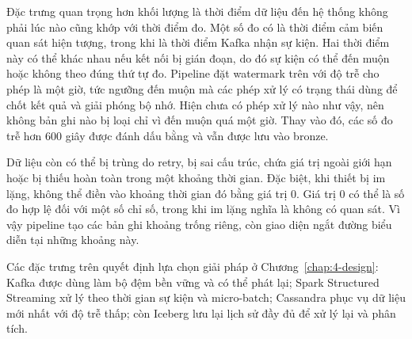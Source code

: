Đặc trưng quan trọng hơn khối lượng là thời điểm dữ liệu đến hệ thống không phải lúc nào cũng khớp với thời điểm đo. Một số đo có  là thời điểm cảm biến quan sát hiện tượng, trong khi  là thời điểm Kafka nhận sự kiện. Hai thời điểm này có thể khác nhau nếu kết nối bị gián đoạn, do đó sự kiện có thể đến muộn hoặc không theo đúng thứ tự đo. Pipeline đặt watermark trên  với độ trễ cho phép là một giờ, tức ngưỡng đến muộn mà các phép xử lý có trạng thái dùng để chốt kết quả và giải phóng bộ nhớ. Hiện chưa có phép xử lý nào như vậy, nên không bản ghi nào bị loại chỉ vì đến muộn quá một giờ. Thay vào đó, các số đo trễ hơn 600 giây được đánh dấu bằng  và vẫn được lưu vào bronze.

Dữ liệu còn có thể bị trùng do retry, bị sai cấu trúc, chứa giá trị ngoài giới hạn hoặc bị thiếu hoàn toàn trong một khoảng thời gian. Đặc biệt, khi thiết bị im lặng, không thể điền vào khoảng thời gian đó bằng giá trị 0. Giá trị 0 có thể là số đo hợp lệ đối với một số chỉ số, trong khi im lặng nghĩa là không có quan sát. Vì vậy pipeline tạo các bản ghi khoảng trống riêng, còn giao diện ngắt đường biểu diễn tại những khoảng này.

Các đặc trưng trên quyết định lựa chọn giải pháp ở Chương~\ref{chap:4-design}: Kafka được dùng làm bộ đệm bền vững và có thể phát lại; Spark Structured Streaming xử lý theo thời gian sự kiện và micro-batch; Cassandra phục vụ dữ liệu mới nhất với độ trễ thấp; còn Iceberg lưu lại lịch sử đầy đủ để xử lý lại và phân tích.


